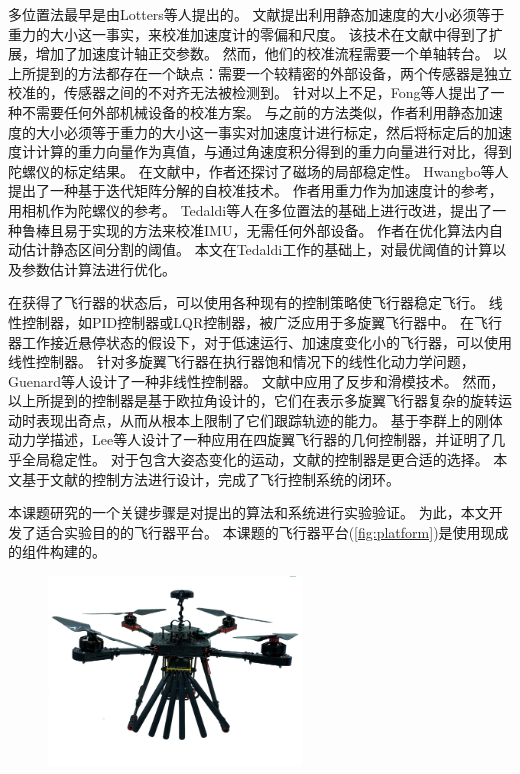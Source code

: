 \documentclass[
  type=master
]{gdutthesis}
\begin{document}
多位置法最早是由Lotters等人提出的\cite{lotters1998procedure}。
文献\parencite{lotters1998procedure}提出利用静态加速度的大小必须等于重力的大小这一事实，来校准加速度计的零偏和尺度。
该技术在文献\parencite{syed2007new}中得到了扩展，增加了加速度计轴正交参数。
然而，他们的校准流程需要一个单轴转台。
以上所提到的方法都存在一个缺点：需要一个较精密的外部设备，两个传感器是独立校准的，传感器之间的不对齐无法被检测到。
针对以上不足，Fong等人提出了一种不需要任何外部机械设备的校准方案\cite{fong2008methods}。
与之前的方法类似，作者利用静态加速度的大小必须等于重力的大小这一事实对加速度计进行标定，然后将标定后的加速度计计算的重力向量作为真值，与通过角速度积分得到的重力向量进行对比，得到陀螺仪的标定结果。
在文献\parencite{cheuk2012automatic}中，作者还探讨了磁场的局部稳定性。
Hwangbo等人提出了一种基于迭代矩阵分解的自校准技术\cite{hwangbo2013imu}。
作者用重力作为加速度计的参考，用相机作为陀螺仪的参考。
Tedaldi等人在多位置法的基础上进行改进，提出了一种鲁棒且易于实现的方法来校准IMU，无需任何外部设备\cite{tedaldi2014robust}。
作者在优化算法内自动估计静态区间分割的阈值。
本文在Tedaldi工作的基础上，对最优阈值的计算以及参数估计算法进行优化。

在获得了飞行器的状态后，可以使用各种现有的控制策略使飞行器稳定飞行。
线性控制器，如PID控制器或LQR控制器，被广泛应用于多旋翼飞行器中\cite{hoffmann2007quadrotor,castillo2004stabilization,nice2004design}。
在飞行器工作接近悬停状态的假设下，对于低速运行、加速度变化小的飞行器，可以使用线性控制器。
针对多旋翼飞行器在执行器饱和情况下的线性化动力学问题，Guenard等人设计了一种非线性控制器\cite{guenard2005dynamic}。
文献\parencite{bouabdallah2005backstepping}中应用了反步和滑模技术。
然而，以上所提到的控制器是基于欧拉角设计的，它们在表示多旋翼飞行器复杂的旋转运动时表现出奇点，从而从根本上限制了它们跟踪轨迹的能力。
基于李群上的刚体动力学描述，Lee等人设计了一种应用在四旋翼飞行器的几何控制器，并证明了几乎全局稳定性\cite{lee2010geometric}。
对于包含大姿态变化的运动，文献\parencite{lee2010geometric}的控制器是更合适的选择。
本文基于文献\parencite{lee2010geometric}的控制方法进行设计，完成了飞行控制系统的闭环。

本课题研究的一个关键步骤是对提出的算法和系统进行实验验证。
为此，本文开发了适合实验目的的飞行器平台。
本课题的飞行器平台(\autoref{fig:platform})是使用现成的组件构建的。
\begin{figure}[H]
	\centering
	\includegraphics[width=0.6\textwidth]{platform.png}
	\label{fig:platform}
\end{figure} 
\end{document}
